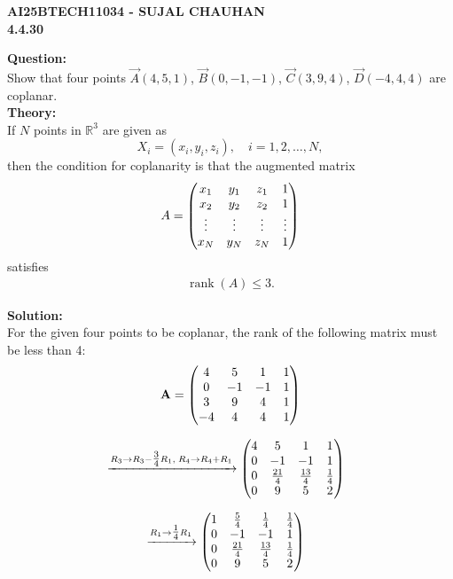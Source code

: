 \documentclass[12pt]{article}
\begin{document}
\newpage
\begin{center}
\textbf{\Large AI25BTECH11034 - SUJAL CHAUHAN }\\
\textbf{4.4.30}
\end{center}

\textbf{Question:}\\
Show that four points $\vec{A}(4,5,1)$, $\vec{B}(0,-1,-1)$, $\vec{C}(3,9,4)$, $\vec{D}(-4,4,4)$ are coplanar.\\[1cm]

\textbf{Theory:} \\
If $N$ points in $\mathbb{R}^3$ are given as 
\[
X_i = (x_i, y_i, z_i), \quad i = 1,2,\dots,N,
\] 
then the condition for coplanarity is that the augmented matrix
\begin{align}
A = \begin{pmatrix}
x_1 & y_1 & z_1 & 1 \\
x_2 & y_2 & z_2 & 1 \\
\vdots & \vdots & \vdots & \vdots \\
x_N & y_N & z_N & 1
\end{pmatrix}
\end{align}
satisfies
\begin{align}
\operatorname{rank}(A) \leq 3.
\end{align}



\textbf{Solution:} \\
For the given four points to be coplanar, the rank of the following matrix must be less than 4:
\begin{align}
\mathbf{A}=\begin{pmatrix} 
4 & 5 & 1 & 1\\
0 & -1 & -1 & 1 \\
3 & 9 & 4 & 1\\
-4 & 4 & 4 & 1 
\end{pmatrix}
\end{align}

\begin{align}
&\xrightarrow{R_3 \to R_3 - \tfrac{3}{4}R_1,\; R_4 \to R_4 + R_1}
\begin{pmatrix}
4 & 5 & 1 & 1 \\
0 & -1 & -1 & 1 \\
0 & \tfrac{21}{4} & \tfrac{13}{4} & \tfrac{1}{4} \\
0 & 9 & 5 & 2
\end{pmatrix}
\end{align}

\begin{align}
&\xrightarrow{R_1 \to \tfrac{1}{4}R_1}
\begin{pmatrix}
1 & \tfrac{5}{4} & \tfrac{1}{4} & \tfrac{1}{4} \\
0 & -1 & -1 & 1 \\
0 & \tfrac{21}{4} & \tfrac{13}{4} & \tfrac{1}{4} \\
0 & 9 & 5 & 2
\end{pmatrix}
\end{align}
\end{document}
